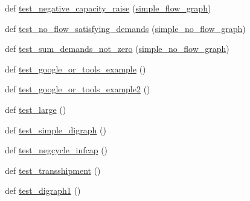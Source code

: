 \begin{DoxyCompactItemize}
\item 
def \hyperlink{namespacenetworkx_1_1algorithms_1_1flow_1_1tests_1_1test__networksimplex_a3fb6b6c71bc850f30fba26f0256518af}{test\+\_\+negative\+\_\+capacity\+\_\+raise} (\hyperlink{namespacenetworkx_1_1algorithms_1_1flow_1_1tests_1_1test__networksimplex_a305eb5523aa6c08c741304317ee53b4f}{simple\+\_\+flow\+\_\+graph})
\item 
def \hyperlink{namespacenetworkx_1_1algorithms_1_1flow_1_1tests_1_1test__networksimplex_af62817445e94118c9b83696b27a19f60}{test\+\_\+no\+\_\+flow\+\_\+satisfying\+\_\+demands} (\hyperlink{namespacenetworkx_1_1algorithms_1_1flow_1_1tests_1_1test__networksimplex_a4b3331d62c725e39860663ede918722d}{simple\+\_\+no\+\_\+flow\+\_\+graph})
\item 
def \hyperlink{namespacenetworkx_1_1algorithms_1_1flow_1_1tests_1_1test__networksimplex_a2eac35df75778b3e0041a3cdea674884}{test\+\_\+sum\+\_\+demands\+\_\+not\+\_\+zero} (\hyperlink{namespacenetworkx_1_1algorithms_1_1flow_1_1tests_1_1test__networksimplex_a4b3331d62c725e39860663ede918722d}{simple\+\_\+no\+\_\+flow\+\_\+graph})
\item 
def \hyperlink{namespacenetworkx_1_1algorithms_1_1flow_1_1tests_1_1test__networksimplex_a2d91e4bc68ff77eaea8c6b8fe95db5f6}{test\+\_\+google\+\_\+or\+\_\+tools\+\_\+example} ()
\item 
def \hyperlink{namespacenetworkx_1_1algorithms_1_1flow_1_1tests_1_1test__networksimplex_a962e73eebcd3340c475c91cc1fece116}{test\+\_\+google\+\_\+or\+\_\+tools\+\_\+example2} ()
\item 
def \hyperlink{namespacenetworkx_1_1algorithms_1_1flow_1_1tests_1_1test__networksimplex_a92294233a1f31df439c38740111e4d55}{test\+\_\+large} ()
\item 
def \hyperlink{namespacenetworkx_1_1algorithms_1_1flow_1_1tests_1_1test__networksimplex_a6c7d737dfc04ecc42f8ae3e629e6e15e}{test\+\_\+simple\+\_\+digraph} ()
\item 
def \hyperlink{namespacenetworkx_1_1algorithms_1_1flow_1_1tests_1_1test__networksimplex_a753000c9f97687d88327546854b55799}{test\+\_\+negcycle\+\_\+infcap} ()
\item 
def \hyperlink{namespacenetworkx_1_1algorithms_1_1flow_1_1tests_1_1test__networksimplex_a72abe31db935dfd270e2fed8d4d37682}{test\+\_\+transshipment} ()
\item 
def \hyperlink{namespacenetworkx_1_1algorithms_1_1flow_1_1tests_1_1test__networksimplex_af1a4b4969e9562914e92ad25531bfb71}{test\+\_\+digraph1} ()
\item 

\end{DoxyCompactItemize}
